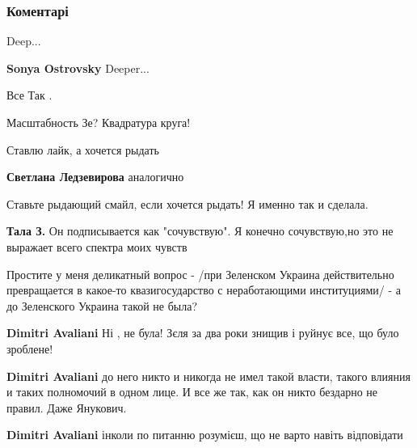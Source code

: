 
 
 
 
 
\subsubsection{Коментарі}
\label{sec:21_09_2021.fb.bereza_borislav.1.kafe_kiev_beseda_zelenskii.cmt}

\begin{itemize} %
Deep...

\textbf{Sonya Ostrovsky} Deeper...

Все Так .

Масштабность Зе? Квадратура круга!

Ставлю лайк, а хочется рыдать

\begin{itemize} %
\textbf{Светлана Ледзевирова} аналогично

Ставьте рыдающий смайл, если хочется рыдать!
Я именно так и сделала.

\textbf{Тала З.} Он подписывается как "сочувствую". Я конечно сочувствую,но это не выражает всего спектра моих чувств
\end{itemize} %


Простите у меня деликатный вопрос - /при Зеленском Украина действительно
превращается в какое-то квазигосударство с неработающими институциями/ - а до
Зеленского Украина такой не была?

\begin{itemize} %
\textbf{Dimitri Avaliani} Ні , не була! Зєля за два роки знищив і руйнує все, що було зроблене!

\textbf{Dimitri Avaliani} до него никто и никогда не имел такой власти, такого влияния и таких полномочий в одном лице. И все же так, как он никто бездарно не правил. Даже Янукович.

\textbf{Dimitri Avaliani} інколи по питанню розумієш, що не варто навіть відповідати


\end{itemize}
\end{itemize}
